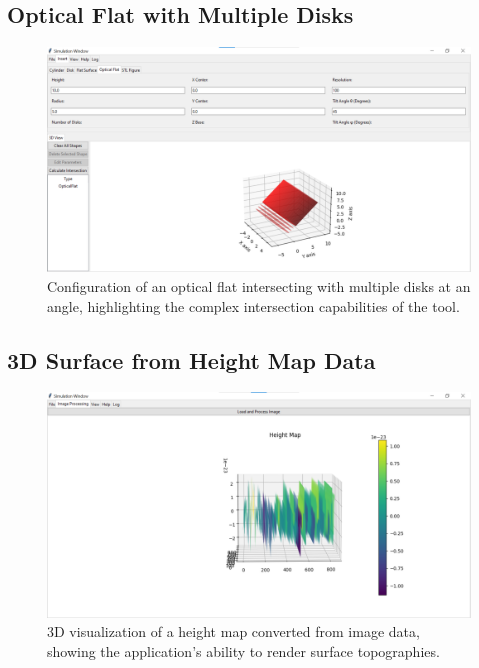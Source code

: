 \documentclass[../main.tex]{subfiles}
\begin{document}
\subsection{Optical Flat with Multiple Disks}
\begin{figure}[H]
\centering
\includegraphics[width=\textwidth]{Images/Appendix/simulation/optical_flat}
\caption{Configuration of an optical flat intersecting with multiple disks at an angle, highlighting the complex intersection capabilities of the tool.}
\end{figure}

\subsection{3D Surface from Height Map Data}
\begin{figure}[H]
\centering
\includegraphics[width=\textwidth]{Images/Appendix/reconstruction/3D_surface}
\caption{3D visualization of a height map converted from image data, showing the application’s ability to render surface topographies.}
\end{figure}
\end{document}
